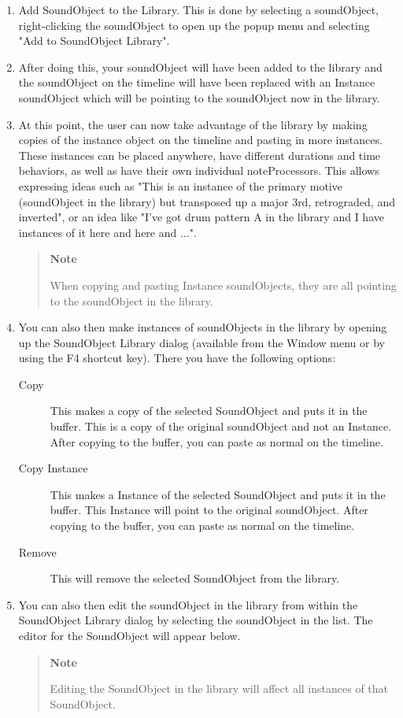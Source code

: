 \begin{enumerate}
\def\labelenumi{\arabic{enumi}.}
\item
  Add SoundObject to the Library. This is done by selecting a
  soundObject, right-clicking the soundObject to open up the popup menu
  and selecting "Add to SoundObject Library".
\item
  After doing this, your soundObject will have been added to the library
  and the soundObject on the timeline will have been replaced with an
  Instance soundObject which will be pointing to the soundObject now in
  the library.
\item
  At this point, the user can now take advantage of the library by
  making copies of the instance object on the timeline and pasting in
  more instances. These instances can be placed anywhere, have different
  durations and time behaviors, as well as have their own individual
  noteProcessors. This allows expressing ideas such as "This is an
  instance of the primary motive (soundObject in the library) but
  transposed up a major 3rd, retrograded, and inverted", or an idea like
  "I've got drum pattern A in the library and I have instances of it
  here and here and ...".

  \begin{quote}
  \textbf{Note}

  When copying and pasting Instance soundObjects, they are all pointing
  to the soundObject in the library.
  \end{quote}
\item
  You can also then make instances of soundObjects in the library by
  opening up the SoundObject Library dialog (available from the Window
  menu or by using the F4 shortcut key). There you have the following
  options:

  \begin{description}
  \item[Copy]
  This makes a copy of the selected SoundObject and puts it in the
  buffer. This is a copy of the original soundObject and not an
  Instance. After copying to the buffer, you can paste as normal on the
  timeline.
  \item[Copy Instance]
  This makes a Instance of the selected SoundObject and puts it in the
  buffer. This Instance will point to the original soundObject. After
  copying to the buffer, you can paste as normal on the timeline.
  \item[Remove]
  This will remove the selected SoundObject from the library.
  \end{description}
\item
  You can also then edit the soundObject in the library from within the
  SoundObject Library dialog by selecting the soundObject in the list.
  The editor for the SoundObject will appear below.

  \begin{quote}
  \textbf{Note}

  Editing the SoundObject in the library will affect all instances of
  that SoundObject.
  \end{quote}
\end{enumerate}
